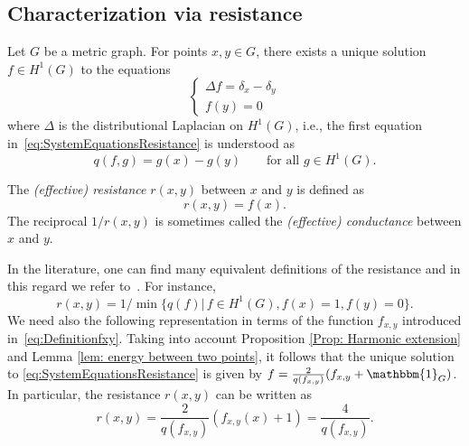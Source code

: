 \documentclass[reqno]{amsart}
\theoremstyle{plain}
\theoremstyle{definition}
\theoremstyle{remark}
\numberwithin{equation}{section}
\newcommand{\one}{\mathbbm{1}}
\begin{document}
\subsection{Characterization via resistance} \label{ss:CharacterizationResistance}

Let $G$ be a metric graph. For points $x,y \in G$, there exists a unique solution $f\in H^1 (G)$ to the equations
\begin{equation}\label{eq:SystemEquationsResistance}
	\begin{cases}
		\Delta f = \delta_x - \delta_y \\
		f(y) =0
	\end{cases}
\end{equation}
where $\Delta$ is the distributional Laplacian on $H^1(G)$, i.e., the first equation in~\eqref{eq:SystemEquationsResistance} is understood as
\[
q(f,g) = g(x) - g(y) \qquad \text{for all $g \in H^1(G)$}.
\]

The \emph{(effective) resistance} $r(x,y)$ between $x$ and $y$ is defined as
\[
r(x,y) =f(x).
\]
The reciprocal $1/r(x,y)$ is sometimes called the \emph{(effective) conductance} between $x$ and $y$.




In the literature, one can find many equivalent definitions of the resistance and in this regard we refer to~\cite[Theorem~3.2]{jp23}. For instance,
\begin{equation}\label{eq: resistance characerisation}
	r(x,y) = 1/ \min\{ q(f) | \, f \in H^1(G), f(x) = 1, f(y) = 0 \}.
\end{equation}
We need also the following representation in terms of the function $f_{x,y}$ introduced in~\eqref{eq:Definitionfxy}. Taking into account Proposition \ref{Prop: Harmonic extension} and Lemma \ref{lem: energy between two points}, it follows that the unique solution to \eqref{eq:SystemEquationsResistance} is given by $f = \frac{2}{q(f_{x,y})} (f_{x,y}+\one_{G})$. In particular, the resistance $r(x,y)$ can be written as
\begin{equation} \label{eq:RepresentationResistance}
	r(x,y) = \frac{2}{q(f_{x,y})} (f_{x,y}(x) +1)  = \frac{4}{q(f_{x,y})}.
\end{equation}
\end{document}

